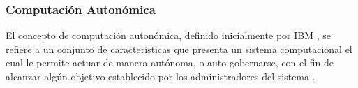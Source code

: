 






\subsubsection{Computación Autonómica}


El concepto de computación autonómica, definido inicialmente por IBM \citeyear{horn_2001}, se refiere a un conjunto de características que presenta un sistema computacional el cual le permite actuar de manera autónoma, o auto-gobernarse, con el fin de alcanzar algún objetivo establecido por los administradores del sistema \cite{lalanda_diaconescu_mccann_2014}.


